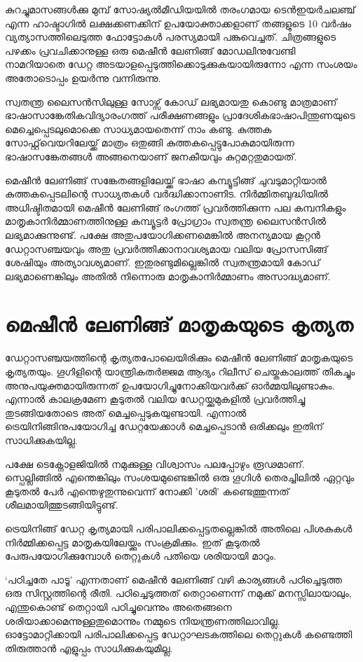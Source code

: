 \documentclass[12pt,twoside,a4paper]{article}
\begin{document}
കുറച്ചുമാസങ്ങൾക്കു മുമ്പ് സോഷ്യൽമീഡിയയിൽ തരംഗമായ ടെൻഇയർചലഞ്ച് എന്ന ഹാഷ്ടാഗിൽ ലക്ഷക്കണക്കിന് ഉപയോക്താക്കളാണ് തങ്ങളുടെ 10 വർഷം വ്യത്യാസത്തിലെടുത്ത ഫോട്ടോകൾ പരസ്യമായി പങ്കുവെച്ചത്. ചിത്രങ്ങളുടെ പഴക്കം പ്രവചിക്കാനുള്ള ഒരു മെഷീൻ ലേണിങ്ങ് മോഡലിനുവേണ്ടി നാമറിയാതെ ഡേറ്റ അടയാളപ്പെടുത്തിക്കൊടുക്കുകയായിരുന്നോ എന്ന സംശയം അതോടൊപ്പം ഉയർന്നു വന്നിരുന്നു.

സ്വതന്ത്ര ലൈസൻസിലുള്ള സോഴ്സ് കോഡ് ലഭ്യമായതു കൊണ്ടു മാത്രമാണ് ഭാഷാസാങ്കേതികവിദ്യാരംഗത്ത് പരീക്ഷണങ്ങളും പ്രാദേശികഭാഷാപിന്തുണയുടെ മെച്ചെപ്പെടലുമൊക്കെ സാധ്യമായതെന്ന് നാം കണ്ടു. കുത്തക സോഫ്റ്റ്‌വെയറിലേയ്ക്ക് മാത്രം ഒതുങ്ങി കുത്തകപ്പെട്ടുപോകുമായിരുന്ന ഭാഷാസങ്കേതങ്ങൾ അങ്ങനെയാണ് ജനകീയവും കുറ്റമറ്റതുമായത്.

മെഷീൻ ലേണിങ്ങ് സങ്കേതങ്ങളിലേയ്ക്ക് ഭാഷാ കമ്പ്യൂട്ടിങ്ങ് ചുവടുമാറ്റിയാൽ കുത്തകപ്പെടലിന്റെ സാധ്യതകൾ വർദ്ധിക്കാനാണിട. നിർമ്മിതബുദ്ധിയിൽ അധിഷ്ടിതമായി മെഷീൻ ലേണിങ്ങ് രംഗത്ത് പ്രവർത്തിക്കുന്ന പല കമ്പനികളും മാതൃകാനിർമ്മാണത്തിനുള്ള കമ്പ്യൂട്ടർ പ്രോഗ്രാം സ്വതന്ത്ര ലൈസൻസിൽ ലഭ്യമാക്കുന്നുണ്ട്. പക്ഷേ അതുപയോഗിക്കണമെങ്കിൽ അനന്യമായ കൂറ്റൻ ഡേറ്റാസഞ്ചയവും അതു പ്രവർത്തിക്കാനാവശ്യമായ വലിയ പ്രോസസിങ്ങ് ശേഷിയും അത്യാവശ്യമാണ്. ഇതുരണ്ടുമില്ലെങ്കിൽ സ്വതന്ത്രമായി കോഡ് ലഭ്യമാണെങ്കിലും അതിൽ നിന്നൊരു മാതൃകാനിർമ്മാണം അസാദ്ധ്യമാണ്.


\section{മെഷീൻ ലേണിങ്ങ് മാതൃകയുടെ കൃത്യത}

ഡേറ്റാസഞ്ചയത്തിന്റെ കൃത്യതപോലെയിരിക്കും  മെഷീൻ ലേണിങ്ങ് മാതൃകയുടെ കൃത്യതയും. ഗൂഗിളിന്റെ യാന്ത്രികതർജ്ജമ ആദ്യം റിലീസ് ചെയ്തകാലത്ത് തികച്ചും അനുപയുക്തമായിരുന്നത് ഉപയോഗിച്ചുനോക്കിയവർക്ക് ഓർമ്മയിലുണ്ടാകും. എന്നാൽ കാലക്രമേണ കൂടുതൽ വലിയ ഡേറ്റയ്ക്കുമുകളിൽ പ്രവർത്തിച്ചു തുടങ്ങിയതോടെ അത് മെച്ചപ്പെടുകയുണ്ടായി. എന്നാൽ ട്രെയിനിങ്ങിനുപയോഗിച്ച ഡേറ്റയേക്കാൾ മെച്ചപ്പെടാൻ ഒരിക്കലും ഇതിന് സാധിക്കുകയില്ല.

പക്ഷേ ടെക്നോളജിയിൽ നമുക്കുള്ള വിശ്വാസം പലപ്പോഴും രൂഢമാണ്. സ്പെല്ലിങ്ങിൽ എന്തെങ്കിലും സംശയമുണ്ടെങ്കിൽ ഒരു ഗൂഗിൾ തെരച്ചിലിൽ ഏറ്റവും കൂടുതൽ പേർ എന്തെഴുതുന്നുവെന്ന് നോക്കി 'ശരി' കണ്ടെത്തുന്നത് ശീലമായിത്തുടങ്ങിയിട്ടുണ്ട്.

ട്രെയിനിങ്ങ് ഡേറ്റ കൃത്യമായി പരിപാലിക്കപ്പെട്ടതല്ലെങ്കിൽ അതിലെ പിശകുകൾ നിർമ്മിക്കപ്പെട്ട മാതൃകയിലേയ്ക്കും സംക്രമിക്കും. ഇത് കൂടുതൽ പേരുപയോഗിക്കുമ്പോൾ തെറ്റുകൾ പതിയെ ശരിയായി മാറും.

`പഠിച്ചതേ പാടൂ' എന്നതാണ് മെഷീൻ ലേണിങ്ങ് വഴി കാര്യങ്ങൾ പഠിച്ചെടുത്ത ഒരു സിസ്റ്റത്തിന്റെ രീതി. പഠിച്ചെടുത്തത് തെറ്റാണെന്ന് നമുക്ക് മനസ്സിലായാലും, എന്തുകൊണ്ട് തെറ്റായി പഠിച്ചുവെന്നും അതെങ്ങനെ ശരിയാക്കാമെന്നുള്ളതുമൊന്നും നമ്മുടെ നിയന്ത്രണത്തിലാവില്ല.  ഓട്ടോമാറ്റിക്കായി പരിപാലിക്കപ്പെട്ട ഡേറ്റാഘടകത്തിലെ തെറ്റുകൾ  കണ്ടെത്തി തിരുത്താൻ എളുപ്പം സാധിക്കുകയുമില്ല.
\end{document}
